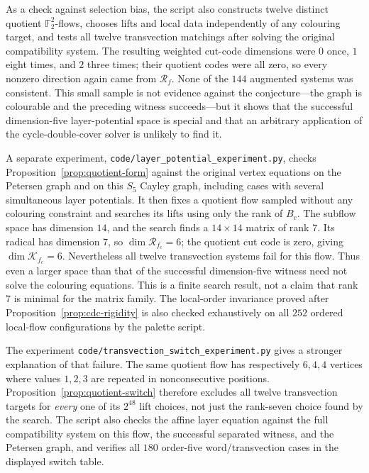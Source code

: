 \documentclass[11pt,a4paper]{article}
\theoremstyle{definition}
\theoremstyle{remark}
\begin{document}
As a check against selection bias, the script also constructs twelve distinct quotient $\mathbb F_2^2$-flows, chooses lifts and local data independently of any colouring target, and tests all twelve transvection matchings after solving the original compatibility system.  The resulting weighted cut-code dimensions were $0$ once, $1$ eight times, and $2$ three times; their quotient codes were all zero, so every nonzero direction again came from $\mathcal R_f$.  None of the $144$ augmented systems was consistent.  This small sample is not evidence against the conjecture---the graph is colourable and the preceding witness succeeds---but it shows that the successful dimension-five layer-potential space is special and that an arbitrary application of the cycle-double-cover solver is unlikely to find it.

A separate experiment, \nolinkurl{code/layer_potential_experiment.py}, checks Proposition~\ref{prop:quotient-form} against the original vertex equations on the Petersen graph and on this $S_5$ Cayley graph, including cases with several simultaneous layer potentials.  It then fixes a quotient flow sampled without any colouring constraint and searches its lifts using only the rank of $B_c$.  The subflow space has dimension $14$, and the search finds a $14\times14$ matrix of rank $7$.  Its radical has dimension $7$, so $\dim\mathcal R_{f_c}=6$; the quotient cut code is zero, giving $\dim\mathcal K_{f_c}=6$.  Nevertheless all twelve transvection systems fail for this flow.  Thus even a larger space than that of the successful dimension-five witness need not solve the colouring equations.  This is a finite search result, not a claim that rank $7$ is minimal for the matrix family.  The local-order invariance proved after Proposition~\ref{prop:cdc-rigidity} is also checked exhaustively on all $252$ ordered local-flow configurations by the palette script.

The experiment \nolinkurl{code/transvection_switch_experiment.py} gives a stronger explanation of that failure.  The same quotient flow has respectively $6,4,4$ vertices where values $1,2,3$ are repeated in nonconsecutive positions.  Proposition~\ref{prop:quotient-switch} therefore excludes all twelve transvection targets for \emph{every} one of its $2^{48}$ lift choices, not just the rank-seven choice found by the search.  The script also checks the affine layer equation against the full compatibility system on this flow, the successful separated witness, and the Petersen graph, and verifies all $180$ order-five word/transvection cases in the displayed switch table.
\end{document}
